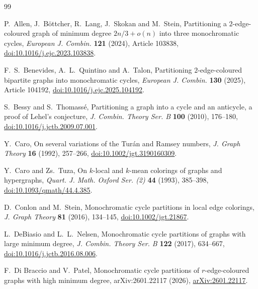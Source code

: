 \documentclass[a4paper,12pt,reqno]{amsart}
\begin{document}
\begin{thebibliography}{99}

P.~Allen, J.~B\"ottcher, R.~Lang, J.~Skokan and M.~Stein,
\newblock Partitioning a $2$-edge-coloured graph of minimum degree
  $2n/3+o(n)$ into three monochromatic cycles,
\newblock \emph{European J. Combin.} \textbf{121} (2024), Article 103838,
\newblock \href{https://doi.org/10.1016/j.ejc.2023.103838}{doi:10.1016/j.ejc.2023.103838}.

F.~S.~Benevides, A.~L.~Quintino and A.~Talon,
\newblock Partitioning $2$-edge-coloured bipartite graphs into monochromatic
  cycles,
\newblock \emph{European J. Combin.} \textbf{130} (2025), Article 104192,
\newblock \href{https://doi.org/10.1016/j.ejc.2025.104192}{doi:10.1016/j.ejc.2025.104192}.

S.~Bessy and S.~Thomass\'e,
\newblock Partitioning a graph into a cycle and an anticycle, a proof of
  Lehel's conjecture,
\newblock \emph{J. Combin. Theory Ser. B} \textbf{100} (2010), 176--180,
\newblock \href{https://doi.org/10.1016/j.jctb.2009.07.001}{doi:10.1016/j.jctb.2009.07.001}.

Y.~Caro,
\newblock On several variations of the Tur\'{a}n and Ramsey numbers,
\newblock \emph{J. Graph Theory} \textbf{16} (1992), 257--266,
\newblock \href{https://doi.org/10.1002/jgt.3190160309}{doi:10.1002/jgt.3190160309}.

Y.~Caro and Zs.~Tuza,
\newblock On $k$-local and $k$-mean colorings of graphs and hypergraphs,
\newblock \emph{Quart. J. Math. Oxford Ser. (2)} \textbf{44} (1993), 385--398,
\newblock \href{https://doi.org/10.1093/qmath/44.4.385}{doi:10.1093/qmath/44.4.385}.

D.~Conlon and M.~Stein,
\newblock Monochromatic cycle partitions in local edge colorings,
\newblock \emph{J. Graph Theory} \textbf{81} (2016), 134--145,
\newblock \href{https://doi.org/10.1002/jgt.21867}{doi:10.1002/jgt.21867}.

L.~DeBiasio and L.~L.~Nelsen,
\newblock Monochromatic cycle partitions of graphs with large minimum degree,
\newblock \emph{J. Combin. Theory Ser. B} \textbf{122} (2017), 634--667,
\newblock \href{https://doi.org/10.1016/j.jctb.2016.08.006}{doi:10.1016/j.jctb.2016.08.006}.

F.~Di Braccio and V.~Patel,
\newblock Monochromatic cycle partitions of $r$-edge-coloured graphs with
  high minimum degree,
\newblock arXiv:2601.22117 (2026),
\newblock \href{https://arxiv.org/abs/2601.22117}{arXiv:2601.22117}.


\end{thebibliography}
\end{document}

